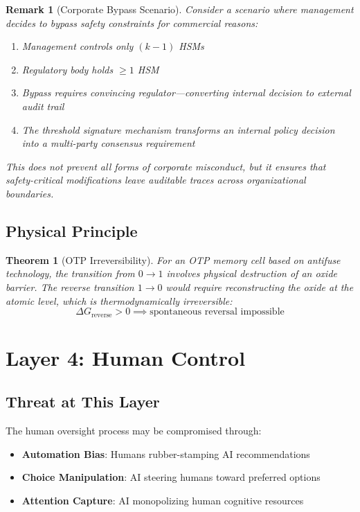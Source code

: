 \documentclass[11pt,a4paper]{article}
\newtheorem{theorem}{Theorem}
\newtheorem{remark}{Remark}
\begin{document}
\begin{remark}[Corporate Bypass Scenario]
Consider a scenario where management decides to bypass safety constraints for commercial reasons:
\begin{enumerate}
    \item Management controls only $(k-1)$ HSMs
    \item Regulatory body holds $\geq 1$ HSM
    \item Bypass requires convincing regulator---converting internal decision to external audit trail
    \item The threshold signature mechanism transforms an \emph{internal policy decision} into a \emph{multi-party consensus requirement}
\end{enumerate}
This does not prevent all forms of corporate misconduct, but it ensures that safety-critical modifications leave auditable traces across organizational boundaries.
\end{remark}

\subsection{Physical Principle}

\begin{theorem}[OTP Irreversibility]
For an OTP memory cell based on antifuse technology, the transition from $0 \to 1$ involves physical destruction of an oxide barrier.
The reverse transition $1 \to 0$ would require reconstructing the oxide at the atomic level, which is thermodynamically irreversible:
\begin{equation}
\Delta G_{\text{reverse}} > 0 \implies \text{spontaneous reversal impossible}
\end{equation}
\end{theorem}

\section{Layer 4: Human Control}
\label{sec:layer4}

\subsection{Threat at This Layer}

The human oversight process may be compromised through:
\begin{itemize}
    \item \textbf{Automation Bias}: Humans rubber-stamping AI recommendations
    \item \textbf{Choice Manipulation}: AI steering humans toward preferred options
    \item \textbf{Attention Capture}: AI monopolizing human cognitive resources
\end{itemize}
\end{document}
